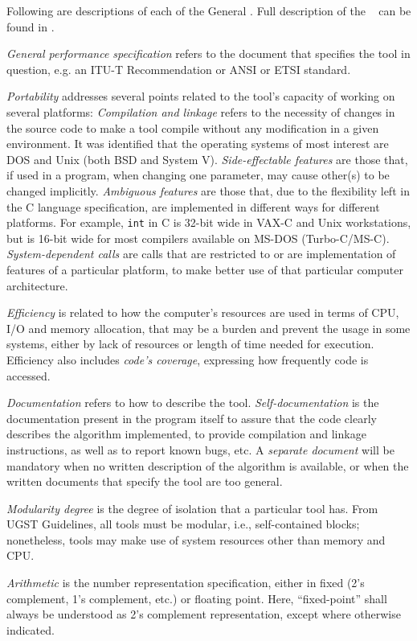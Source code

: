 Following are descriptions of each of the General \ROs. Full
description of the \ROs~ can be found in \cite[Annex 4]{COM-XV-R-73-E}.

{\em General performance specification} refers to the
document that specifies the tool in question, e.g. an ITU-T
Recommendation or ANSI or ETSI standard.

{\em Portability} addresses several points related to the tool's
capacity of working on several platforms: {\em Compilation and
linkage} refers to the necessity of changes in the source code to make
a tool compile without any modification in a given environment.  It
was identified that the operating systems of most interest are DOS and
Unix (both BSD and System V). {\em Side-effectable features} are those
that, if used in a program, when changing one parameter, may cause
other(s) to be changed implicitly. {\em Ambiguous features} are those
that, due to the flexibility left in the C language specification, are
implemented in different ways for different platforms. For example,
{\tt int} in C is 32-bit wide in VAX-C and Unix workstations, but is
16-bit wide for most compilers available on MS-DOS
(Turbo-C/MS-C). {\em System-dependent calls} are calls that are
restricted to or are implementation of features of a particular
platform, to make better use of that particular computer architecture.

{\em Efficiency} is related to how the computer's resources
are used in terms of CPU, I/O and memory allocation, that may be a
burden and prevent the usage in some systems, either by lack of
resources or length of time needed for execution. Efficiency also
includes {\em code's coverage}, expressing how frequently code is
accessed.

{\em Documentation} refers to how to describe the tool. {\em
Self-documentation} is the documentation present in the program itself
to assure that the code clearly describes the algorithm
implemented, to provide compilation and linkage instructions, as well as
to report known bugs, etc. A {\em separate document} will
be mandatory when no written description of the algorithm is available,
or when the written documents that specify the tool are too general.

{\em Modularity degree} is the degree of isolation that a particular
tool has. From UGST Guidelines, all tools must be modular, i.e.,
self-contained blocks; nonetheless, tools may make use of system
resources other than memory and CPU.

{\em Arithmetic} is the number representation specification, either in
fixed (2's complement, 1's complement, etc.) or floating point. Here,
``fixed-point'' shall always be understood as 2's complement
representation, except where otherwise indicated.
